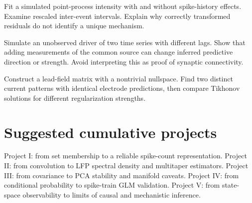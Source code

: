 \begin{exercise}
Fit a simulated point-process intensity with and without spike-history
effects. Examine rescaled inter-event intervals. Explain why
correctly transformed residuals do not identify a unique mechanism.
\end{exercise}
\begin{exercise}
Simulate an unobserved driver of two time series with different lags.
Show that adding measurements of the common source can change
inferred predictive direction or strength. Avoid interpreting
this as proof of synaptic connectivity.
\end{exercise}
\begin{exercise}
Construct a lead-field matrix with a nontrivial nullspace.
Find two distinct current patterns with identical electrode
predictions, then compare Tikhonov solutions for different
regularization strengths.
\end{exercise}

\section{Suggested cumulative projects}
Project I: from set membership to a reliable spike-count
representation. Project II: from convolution to LFP spectral
density and multitaper estimators. Project III: from covariance
to PCA stability and manifold caveats. Project IV: from
conditional probability to spike-train GLM validation.
Project V: from state-space observability to limits of
causal and mechanistic inference.
